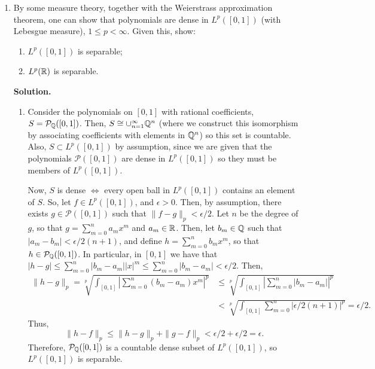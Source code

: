 \documentclass[11pt]{article}
\begin{document}
\begin{enumerate}[label=\arabic*.]
\vspace{1em}

\item By some measure theory, together with the Weierstrass approximation theorem, one can show that polynomials are dense in $L^p([0,1])$ (with Lebesgue measure), $1 \le p < \infty$. Given this, show:
\begin{enumerate}[label=(\alph*)]
\item $L^p([0,1])$ is separable;
\item $L^p(\mathbb{R})$ is separable.
\end{enumerate}

\vspace{1em}


\textbf{Solution.}

\begin{enumerate}
    \item Consider the polynomials on $[0, 1]$ with rational coefficients, $S = \mathcal{P}_{\mathbb{Q}}([0, 1])$.
        Then, $S \cong \cup_{n = 1}^{\infty} \mathbb{Q}^{n}$ (where we construct this isomorphism by associating coefficients with elements in $\mathbb{Q}^{n}$) so this set is countable.
        Also, $S \subset L^{p}([0, 1])$ by assumption, since we are given that the polynomials $\mathcal{P}([0, 1])$ are dense in $L^{p}([0, 1])$ so they must be members of $L^{p}([0, 1])$.

        Now, $S$ is dense $\iff$ every open ball in $L^{p}([0, 1])$ contains an element of $S$.
        So, let $f \in L^{p}([0,1])$, and $\epsilon > 0$.
        Then, by assumption, there exists $g \in \mathcal{P}([0, 1])$ such that $\|f - g\|_{p} < \epsilon / 2$.
        Let $n$ be the degree of $g$, so that $g = \sum_{m = 0}^{n} a_m x^{m}$ and $a_m \in \mathbb{R}$.
        Then, let $b_m \in \mathbb{Q}$ such that $|a_m - b_m| < \epsilon / 2(n + 1)$, and define $h = \sum_{m = 0}^{n} b_m x^{m}$, so that $h \in \mathcal{P}_{\mathbb{Q}}([0, 1])$.
        In particular, in $[0, 1]$ we have that $|h - g| \leq \sum_{m=0}^{n}|b_m - a_m| |x|^{m} \leq \sum_{m = 0}^{n} |b_m -a_m| < \epsilon / 2$.
        Then, 
        \begin{align*}
            \|h - g\|_{p} = \sqrt[p]{\int_{[0, 1]} \left| \sum_{m=0}^{n} (b_m-a_m)x^{m} \right|^{p}} &\leq \sqrt[p]{\int_{[0, 1]} \left|\sum_{m = 0}^{n} |b_m - a_m| \right|^{p} }\\
                                                                                                     &< \sqrt[p]{\int_{[0, 1]}\sum_{m=0}^{n}|\epsilon / 2(n+1)|^{p}} = \epsilon / 2
        .\end{align*}
        Thus, 
        \[
        \|h - f\|_{p} \leq \|h - g\|_{p} + \|g - f\|_{p} < \epsilon / 2 + \epsilon / 2 = \epsilon
        .\] 
        Therefore, $\mathcal{P}_{\mathbb{Q}}([0, 1])$ is a countable dense subset of $L^{p}([0, 1])$, so $L^{p}([0, 1])$ is separable.


\end{enumerate}
\end{enumerate}
\end{document}
